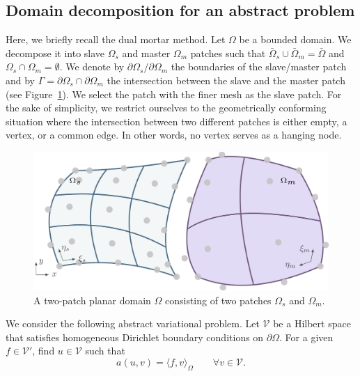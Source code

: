 \subsection{Domain decomposition for an abstract problem}

Here, we briefly recall the dual mortar method. Let $\Omega$ be a bounded domain. We decompose it into slave $\Omega_s$ and master $\Omega_m$ patches such that $\bar{\Omega}_s\cup\bar{\Omega}_m=\bar{\Omega}$ and $\Omega_s\cap\Omega_m=\emptyset$. We denote by $\partial\Omega_s / \partial\Omega_m$ the boundaries of the slave/master patch and by $\Gamma=\partial\Omega_s\cap\partial\Omega_m$ the intersection between the slave and the master patch (see Figure~\ref{fig:two_patch_domain}). We select the patch with the finer mesh as the slave patch. For the sake of simplicity, we restrict ourselves to the geometrically conforming situation where the intersection between two different patches is either empty, a vertex, or a common edge. In other words, no vertex serves as a hanging node. \par

\begin{figure}[ht]
	\center
	\includegraphics[width=.7\columnwidth]{two_patch_domain}
	\caption{A two-patch planar domain $\Omega$ consisting of two patches $\Omega_s$ and $\Omega_m$. }\label{fig:two_patch_domain}
\end{figure}

We consider the following abstract variational problem. Let $\mathcal{V}$ be a Hilbert space that satisfies homogeneous Dirichlet boundary conditions on $\partial \Omega$. For a given $f\in \mathcal{V}'$, find $u\in \mathcal{V}$ such that
\begin{equation}
	a(u,v)=\langle {f,v} \rangle_\Omega \quad\quad\forall v\in\mathcal{V}.\label{eq:abstract_weak_form-chapter4}
\end{equation}

